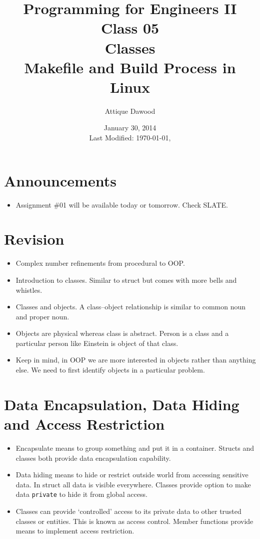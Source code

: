 \documentclass[12pt,a4paper]{article}
\title{\vspace{-2cm}Programming for Engineers II\\Class 05\\Classes\\Makefile and Build Process in Linux}
\author{Attique Dawood}
\date{January 30, 2014\\[0.2cm] Last Modified: \today, \currenttime}
\begin{document}
\maketitle
\section{Announcements}
\begin{itemize}
\item Assignment \#01 will be available today or tomorrow. Check SLATE.
\end{itemize}
\section{Revision}
\begin{itemize}
\item Complex number refinements from procedural to OOP.
\item Introduction to classes. Similar to struct but comes with more bells and whistles.
\item Classes and objects. A class--object relationship is similar to common noun and proper noun.
\item Objects are physical whereas class is abstract. Person is a class and a particular person like Einstein is object of that class.
\item Keep in mind, in OOP we are more interested in objects rather than anything else. We need to first identify objects in a particular problem.
\end{itemize}
\section{Data Encapsulation, Data Hiding and Access Restriction}
\begin{itemize}
\item Encapsulate means to group something and put it in a container. Structs and classes both provide data encapsulation capability.
\item Data hiding means to hide or restrict outside world from accessing sensitive data. In struct all data is visible everywhere. Classes provide option to make data \verb|private| to hide it from global access.
\item Classes can provide `controlled' access to its private data to other trusted classes or entities. This is known as access control. Member functions provide means to implement access restriction.
\end{itemize}
\end{document}
